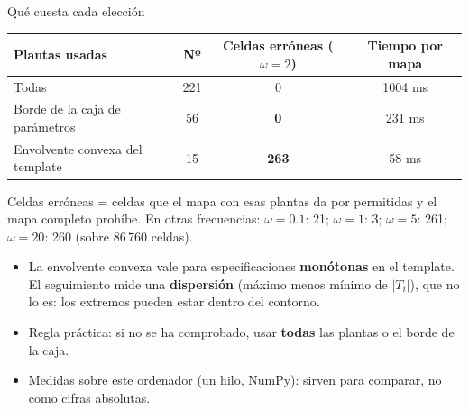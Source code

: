 \documentclass[aspectratio=169,11pt]{beamer}
\begin{document}
\begin{frame}{Qué cuesta cada elección}
  \small
  \begin{center}
  \begin{tabular}{l|c|c|c}
    Plantas usadas & Nº & Celdas erróneas ($\omega=2$) & Tiempo por mapa\\\hline
    Todas & 221 & 0 & 1004 ms\\
    Borde de la caja de parámetros & 56 & \textbf{0} & 231 ms\\
    Envolvente convexa del template & 15 & \textbf{263} & 58 ms
  \end{tabular}
  \end{center}
  \footnotesize
  Celdas erróneas = celdas que el mapa con esas plantas da por permitidas y el mapa completo prohíbe. En otras frecuencias: $\omega=0.1$: 21; $\omega=1$: 3; $\omega=5$: 261; $\omega=20$: 260 (sobre $86\,760$ celdas).
  \begin{itemize}
    \item La envolvente convexa vale para especificaciones \textbf{monótonas} en el template. El seguimiento mide una \textbf{dispersión} (máximo menos mínimo de $|T_i|$), que no lo es: los extremos pueden estar dentro del contorno.
    \item Regla práctica: si no se ha comprobado, usar \textbf{todas} las plantas o el borde de la caja.
    \item Medidas sobre este ordenador (un hilo, NumPy): sirven para comparar, no como cifras absolutas.
  \end{itemize}
\end{frame}
\end{document}
